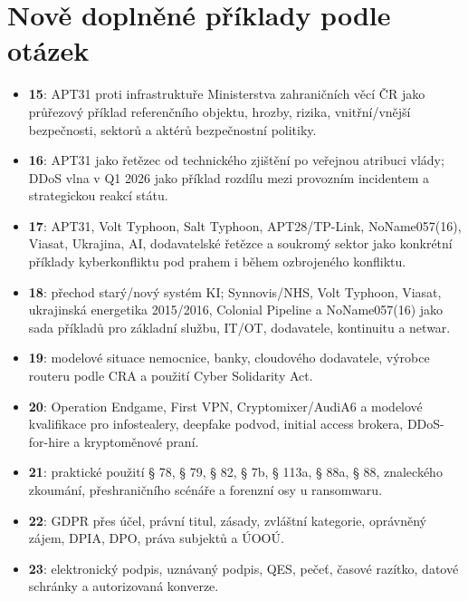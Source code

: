 \documentclass[11pt,a4paper]{article}
\begin{document}
\section*{Nově doplněné příklady podle otázek}
\begin{itemize}
  \item \textbf{15}: APT31 proti infrastruktuře Ministerstva zahraničních věcí ČR jako průřezový příklad referenčního objektu, hrozby, rizika, vnitřní/vnější bezpečnosti, sektorů a aktérů bezpečnostní politiky.
  \item \textbf{16}: APT31 jako řetězec od technického zjištění po veřejnou atribuci vlády; DDoS vlna v Q1 2026 jako příklad rozdílu mezi provozním incidentem a strategickou reakcí státu.
  \item \textbf{17}: APT31, Volt Typhoon, Salt Typhoon, APT28/TP-Link, NoName057(16), Viasat, Ukrajina, AI, dodavatelské řetězce a soukromý sektor jako konkrétní příklady kyberkonfliktu pod prahem i během ozbrojeného konfliktu.
  \item \textbf{18}: přechod starý/nový systém KI; Synnovis/NHS, Volt Typhoon, Viasat, ukrajinská energetika 2015/2016, Colonial Pipeline a NoName057(16) jako sada příkladů pro základní službu, IT/OT, dodavatele, kontinuitu a netwar.
  \item \textbf{19}: modelové situace nemocnice, banky, cloudového dodavatele, výrobce routeru podle CRA a použití Cyber Solidarity Act.
  \item \textbf{20}: Operation Endgame, First VPN, Cryptomixer/AudiA6 a modelové kvalifikace pro infostealery, deepfake podvod, initial access brokera, DDoS-for-hire a kryptoměnové praní.
  \item \textbf{21}: praktické použití § 78, § 79, § 82, § 7b, § 113a, § 88a, § 88, znaleckého zkoumání, přeshraničního scénáře a forenzní osy u ransomwaru.
  \item \textbf{22}: GDPR přes účel, právní titul, zásady, zvláštní kategorie, oprávněný zájem, DPIA, DPO, práva subjektů a ÚOOÚ.
  \item \textbf{23}: elektronický podpis, uznávaný podpis, QES, pečeť, časové razítko, datové schránky a autorizovaná konverze.
\end{itemize}
\end{document}
